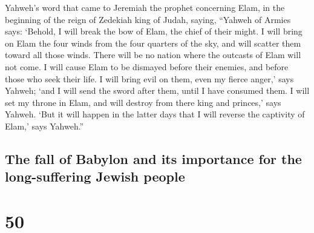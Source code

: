  Yahweh's word that came to Jeremiah the prophet
concerning Elam, in the beginning of the reign of Zedekiah king of
Judah, saying,  ``Yahweh of Armies says: `Behold, I will
break the bow of Elam, the chief of their might.  I will
bring on Elam the four winds from the four quarters of the sky, and will
scatter them toward all those winds. There will be no nation where the
outcasts of Elam will not come.  I will cause Elam to be
dismayed before their enemies, and before those who seek their life. I
will bring evil on them, even my fierce anger,' says Yahweh; `and I will
send the sword after them, until I have consumed them.  I
will set my throne in Elam, and will destroy from there king and
princes,' says Yahweh.  `But it will happen in the latter
days that I will reverse the captivity of Elam,' says Yahweh.''

\hypertarget{the-fall-of-babylon-and-its-importance-for-the-long-suffering-jewish-people}{%
\subsection{The fall of Babylon and its importance for the
long-suffering Jewish
people}\label{the-fall-of-babylon-and-its-importance-for-the-long-suffering-jewish-people}}

\hypertarget{section-49}{%
\section{50}\label{section-49}}

